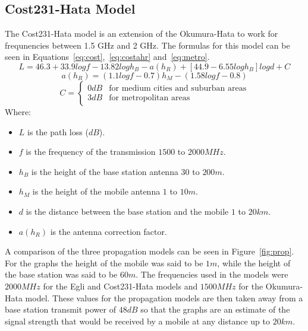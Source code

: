 \subsection{Cost231-Hata Model}
The Cost231-Hata model is an extension of the Okumura-Hata to work for frequnencies between 1.5 GHz and 2 GHz. The formulas for this model can be seen in Equations~\ref{eq:cost},~\ref{eq:costahr} and~\ref{eq:metro}.
\begin{equation}\label{eq:cost}
L=46.3+33.9logf-13.82log{h_{B}}-a(h_{R})+[44.9-6.55log{h_{B}}]log{d}+C
\end{equation}
\begin{equation}\label{eq:costahr}
a(h_{R})=(1.1log{f}-0.7)h_{M}-(1.58log{f}-0.8)
\end{equation}
\begin{equation}\label{eq:metro}
C=
	\begin{cases}
	0 dB & \mbox{for medium cities and suburban areas} \\
	3 dB & \mbox{for metropolitan areas}
	\end{cases}
\end{equation}
Where:
\begin{itemize}
\item $L$ is the path loss ($dB$).
\item $f$ is the frequency of the transmission $1500$ to $2000 MHz$.
\item $h_{B}$ is the height of the base station antenna $30$ to $200 m$.
\item $h_{M}$ is the height of the mobile antenna $1$ to $10 m$.
\item $d$ is the distance between the base station and the mobile $1$ to $20 km$.
\item $a(h_{R})$ is the antenna correction factor.
\end{itemize}
A comparison of the three propagation models can be seen in Figure~\ref{fig:prop}. For the graphs the height of the mobile was said to be $1 m$, while the height of the base station was said to be $60 m$. The frequencies used in the models were $2000 MHz$ for the Egli and Cost231-Hata models and $1500 MHz$ for the Okumura-Hata model. These values for the propagation models are then taken away from a base station transmit power of $48 dB$ so that the graphs are an estimate of the signal strength that would be received by a mobile at any distance up to $20 km$.
